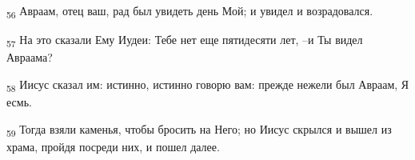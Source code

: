 \begin{tcolorbox}
\textsubscript{56} Авраам, отец ваш, рад был увидеть день Мой; и увидел и возрадовался.
\end{tcolorbox}
\begin{tcolorbox}
\textsubscript{57} На это сказали Ему Иудеи: Тебе нет еще пятидесяти лет, --и Ты видел Авраама?
\end{tcolorbox}
\begin{tcolorbox}
\textsubscript{58} Иисус сказал им: истинно, истинно говорю вам: прежде нежели был Авраам, Я есмь.
\end{tcolorbox}
\begin{tcolorbox}
\textsubscript{59} Тогда взяли каменья, чтобы бросить на Него; но Иисус скрылся и вышел из храма, пройдя посреди них, и пошел далее.
\end{tcolorbox}
